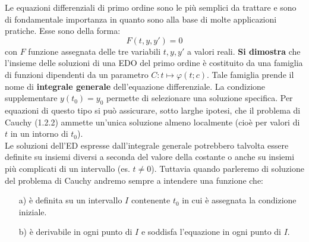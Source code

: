 \documentclass[a4paper]{article}
\numberwithin{equation}{subsection}
\begin{document}
Le equazioni differenziali di primo ordine sono le più semplici da trattare e sono di fondamentale importanza in quanto sono alla base di molte applicazioni pratiche.
Esse sono della forma:
\begin{equation}
    F(t, y, y') = 0
\end{equation}
con $F$ funzione assegnata delle tre variabili $t, y, y'$ a valori reali.
\noindent
\textbf{Si dimostra} che l'insieme delle soluzioni di una EDO del primo ordine è costituito da una famiglia di funzioni dipendenti da un parametro 
$C: t \mapsto \varphi(t; c)$. Tale famiglia prende il nome di \textbf{integrale generale} dell'equazione differenziale.
La condizione supplementare $y(t_0) = y_0$ permette di selezionare una soluzione specifica.
\noindent
Per equazioni di questo tipo si può assicurare, sotto larghe ipotesi, che il problema di Cauchy (1.2.2) ammette un'unica soluzione almeno 
localmente (cioè per valori di $t$ in un intorno di $t_0$).
\\
Le soluzioni dell'ED espresse dall'integrale generale potrebbero talvolta
essere definite su insiemi diversi a seconda del valore della costante o anche su insiemi più complicati
di un intervallo (es. $t \neq 0$). Tuttavia quando parleremo di soluzione del problema di Cauchy andremo
sempre a intendere una funzione che:
\begin{itemize}
    \item[a)] è definita su un intervallo $I$ contenente $t_0$ in cui è assegnata la condizione iniziale.
    \item[b)] è derivabile in ogni punto di $I$ e soddisfa l'equazione in ogni punto di $I$. 
\end{itemize}
\end{document}
